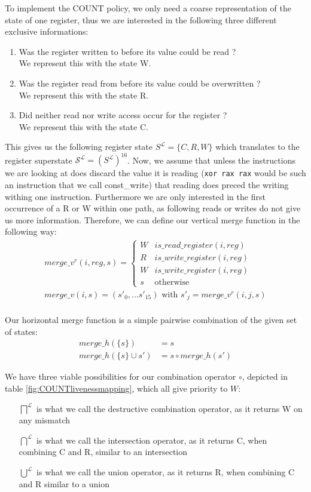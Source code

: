 To implement the COUNT policy, we only need a coarse representation of the state of one register, thus we are interested in the following three different exclusive informations:
\begin{enumerate}
\item Was the register written to before its value could be read ? \\ We represent this with the state W.
\item Was the register read from before its value could be overwritten ? \\ We represent this with the state R.
\item Did neither read nor write access occur for the register ? \\ We represent this with the state C.
\end{enumerate}
This gives us the following register state $S^\mathcal{L} = \{ C, R, W \}$ which translates to the register superstate $\mathcal{S}^\mathcal{L} = (S^\mathcal{L})^{16}$.
Now, we assume that unless the instructions we are looking at does discard the value it is reading (\texttt{xor rax rax} would be such an instruction that we call const\_write) that reading does preced the writing withing one instruction. Furthermore we are only interested in the first occurrence of a R or W within one path, as following reads or writes do not give us more information.
Therefore, we can define our vertical merge function in the following way:
\begin{align}
merge\_v^{r} (i, reg, s) = \left\{
  \begin{array}{lr}
    W & is\_read\_register(i, reg)\\
    R & is\_write\_register(i, reg)\\
    W & is\_write\_register(i, reg)\\
    s & \text{otherwise}
  \end{array}
\right. \\
merge\_v (i, s) = (s'_0, ... s'_15) \text { with } s'_j = merge\_v^{r}(i, j, s)\\
\end{align}

Our horizontal merge function is a simple pairwise combination of the given set of states:
\begin{align}
merge\_h(\{s\}) &= s\\
merge\_h(\{s\} \cup s') &= s \circ merge\_h(s')
\end{align}

We have three viable possibilities for our combination operator $\circ$, depicted in table \ref{fig:COUNTlivenessmapping}, which all give priority to $W$:
\begin{itemize}
\item [$\bigsqcap^{\mathcal{L}}$] is what we call the destructive combination operator, as it returns W on any mismatch
\item [$\bigcap^{\mathcal{L}}$] is what we call the intersection operator, as it returns C, when combining C and R, similar to an intersection
\item [$\bigcup^{\mathcal{L}}$] is what we call the union operator, as it returns R, when combining C and R similar to a union
\end{itemize}



